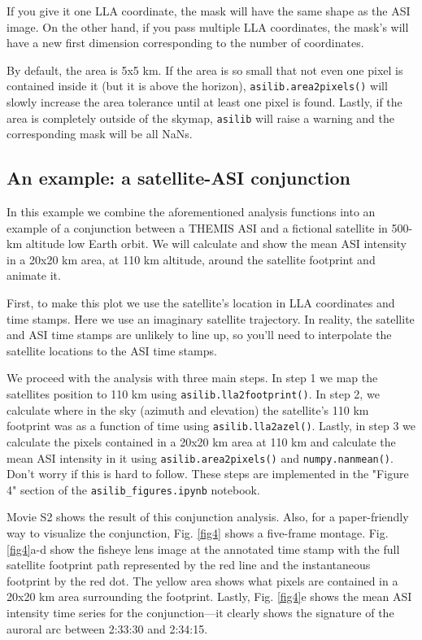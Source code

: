 \documentclass[draft]{agujournal2019}
\begin{document}
If you give it one LLA coordinate, the mask will have the same shape as the ASI image. On the other hand, if you pass multiple LLA coordinates, the mask's will have a new first dimension corresponding to the number of coordinates.

By default, the area is 5x5 km. If the area is so small that not even one pixel is contained inside it (but it is above the horizon), \verb|asilib.area2pixels()| will slowly increase the area tolerance until at least one pixel is found. Lastly, if the area is completely outside of the skymap, \verb|asilib| will raise a warning and the corresponding mask will be all NaNs. 

\subsection{An example: a satellite-ASI conjunction}\label{satellite_conjunction}
In this example we combine the aforementioned analysis functions into an example of a conjunction between a THEMIS ASI and a fictional satellite in 500-km altitude low Earth orbit. We will calculate and show the mean ASI intensity in a 20x20 km area, at 110 km altitude, around the satellite footprint and animate it.

First, to make this plot we use the satellite's location in LLA coordinates and time stamps. Here we use an imaginary satellite trajectory. In reality, the satellite and ASI time stamps are unlikely to line up, so you'll need to interpolate the satellite locations to the ASI time stamps.

We proceed with the analysis with three main steps. In step 1 we map the satellites position to 110 km using \verb|asilib.lla2footprint()|. In step 2, we calculate where in the sky (azimuth and elevation) the satellite's 110 km footprint was as a function of time using \verb|asilib.lla2azel()|. Lastly, in step 3 we calculate the pixels contained in a 20x20 km area at 110 km and calculate the mean ASI intensity in it using \verb|asilib.area2pixels()| and \verb|numpy.nanmean()|. Don't worry if this is hard to follow. These steps are implemented in the "Figure 4" section of the \verb|asilib_figures.ipynb| notebook.

Movie S2 shows the result of this conjunction analysis. Also, for a paper-friendly way to visualize the conjunction, Fig. \ref{fig4} shows a five-frame montage. Fig. \ref{fig4}a-d show the fisheye lens image at the annotated time stamp with the full satellite footprint path represented by the red line and the instantaneous footprint by the red dot. The yellow area shows what pixels are contained in a 20x20 km area surrounding the footprint. Lastly, Fig. \ref{fig4}e shows the mean ASI intensity time series for the conjunction---it clearly shows the signature of the auroral arc between 2:33:30 and 2:34:15.
\end{document}
